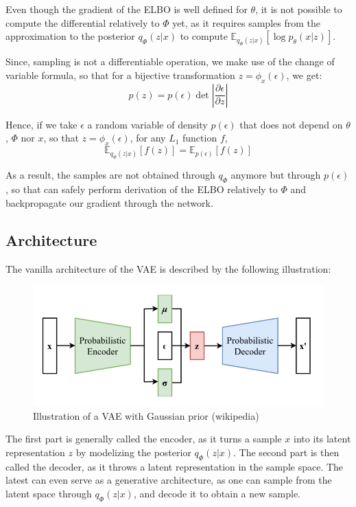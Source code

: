 Even though the gradient of the ELBO is well defined for $\theta$, it is not possible to compute the differential relatively to $\Phi$ yet, as it requires samples from the approximation to the posterior $q_{\Phi}(z|x)$ to compute $\mathbb{E}_{q_{\Phi}(z|x)}[\log p_{\theta}(x|z)]$.
\medskip

Since, sampling is not a differentiable operation, we make use of the change of variable formula, so that for a bijective transformation $z = \phi_x(\epsilon)$, we get:
$$
p(z) = p(\epsilon) \det \left| \frac{\partial \epsilon}{\partial z}\right|
$$

Hence, if we take $\epsilon$ a random variable of density $p(\epsilon)$ that does not depend on $\theta$, $\Phi$ nor $x$, so that $z = \phi_x(\epsilon)$, for any $L_1$ function $f$,
$$
\mathbb{E}_{q_{\Phi}(z|x)}[f(z)] = \mathbb{E}_{p(\epsilon)}[f(z)]
$$

As a result, the samples are not obtained through $q_{\Phi}$ anymore but through $p(\epsilon)$, so that can safely perform derivation of the ELBO relatively to $\Phi$ and backpropagate our gradient through the network.

\subsection{Architecture}

The vanilla architecture of the VAE is described by the following illustration:

\begin{figure}[H]
    \centering
    \includegraphics[width=.7\textwidth]{images/Reparameterized_Variational_Autoencoder}
    \caption{Illustration of a VAE with Gaussian prior (wikipedia)}
    \label{fig:vae_architecture}
\end{figure}

The first part is generally called the encoder, as it turns a sample $x$ into its latent representation $z$ by modelizing the posterior $q_{\Phi}(z|x)$. The second part is then called the decoder, as it throws a latent representation in the sample space. The latest can even serve as a generative architecture, as one can sample from the latent space through $q_{\Phi}(z|x)$, and decode it to obtain a new sample.
\medskip

